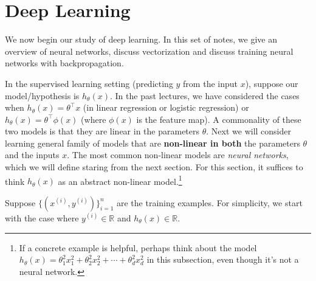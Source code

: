 \titlespacing*{\part}{0pt}{-20pt}{30pt} %
\titlespacing*{\chapter}{0pt}{-10pt}{30pt}

\part{Deep Learning}
\label{part:deep_learning}


We now begin our study of deep learning. In this set of notes, we give an
overview of neural networks, discuss vectorization and discuss training neural
networks with backpropagation.

\vspace{1cm}
\begin{fullwidth}
\label{sec:sl_nonlinear}
\end{fullwidth}
In the supervised learning setting (predicting $y$ from the input $x$), suppose
our model/hypothesis is $h_\theta(x)$. In the past lectures, we have considered the
cases when $h_\theta(x) = \theta^\top x$ (in linear regression or logistic regression) or $h_\theta(x) =
\theta^\top \phi(x)$ (where $\phi(x)$ is the feature map). A commonality of these two models
is that they are linear in the parameters $\theta$. Next we will consider learning
general family of models that are \textbf{non-linear in both} the parameters $\theta$
and the inputs $x$. The most common non-linear models are \textit{neural networks},
which we will define staring from the next section. For this section, it suffices
to think $h_\theta(x)$ as an abstract non-linear model.\footnote{
If a concrete example is helpful, perhaps think about the model
$h_\theta(x) = \theta^2_1 x^2_1 + \theta^2_2 x^2_2 + \cdots + \theta^2_d x^2_d$
in this subsection, even though it's not a neural network.
}

Suppose $\{(x^{(i)}, y^{(i)})\}^n_{i=1}$ are the training examples. For simplicity, we start
with the case where $y^{(i)} \in \mathbb{R}$ and $h_\theta(x) \in \mathbb{R}$.

